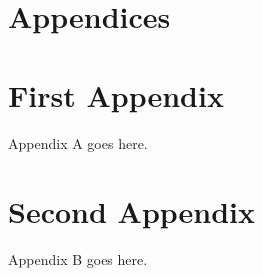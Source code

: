 \appendix

\section*{Appendices}

\section{First Appendix}
Appendix A goes here.

\section{Second Appendix}
Appendix B goes here.
